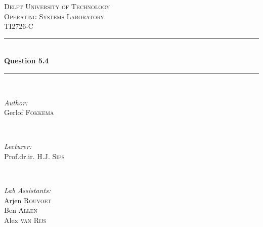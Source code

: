 \documentclass[12pt]{article}
\begin{document}
\begin{titlepage}

\newcommand{\HRule}{\rule{\linewidth}{0.5mm}} %

\center %
 

\textsc{\LARGE Delft University of Technology}\\[1.5cm] %
\textsc{\Large Operating Systems Laboratory}\\[0.5cm] %
\textsc{\large TI2726-C}\\[0.5cm] %


\HRule \\[0.4cm]
{ \huge \bfseries Question 5.4}\\[0.4cm] %
\HRule \\[1.5cm]
 

\begin{minipage}{0.4\textwidth}
\begin{flushleft} \large
\emph{Author:}\\
Gerlof \textsc{Fokkema} %
\end{flushleft}
\end{minipage}
~
\begin{minipage}{0.4\textwidth}
\begin{flushright} \large
\emph{Lecturer:} \\
Prof.dr.ir. H.J. \textsc{Sips} %
\end{flushright}
\end{minipage}\\[1cm]

\begin{minipage}{0.4\textwidth}
\begin{flushleft} \large
\emph{Lab Assistants:}\\
Arjen \textsc{Rouvoet}\\
Ben \textsc{Allen}\\
Alex \textsc{van Rijs} %
\end{flushleft}
\end{minipage}
~
\begin{minipage}{0.4\textwidth}
\begin{flushright} \large


\end{flushright}
\end{minipage}
\end{titlepage}
\end{document}
